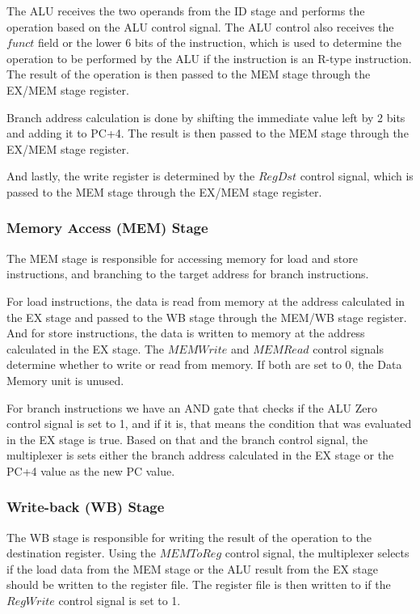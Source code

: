 The ALU receives the two operands from the ID stage and performs the operation based on the ALU control signal. The ALU control also receives the $funct$ field or the lower 6 bits of the instruction, which is used to determine the operation to be performed by the ALU if the instruction is an R-type instruction. The result of the operation is then passed to the MEM stage through the EX/MEM stage register.

Branch address calculation is done by shifting the immediate value left by 2 bits and adding it to PC+4. The result is then passed to the MEM stage through the EX/MEM stage register.

And lastly, the write register is determined by the $RegDst$ control signal, which is passed to the MEM stage through the EX/MEM stage register.


\subsubsection{Memory Access (MEM) Stage}
The MEM stage is responsible for accessing memory for load and store instructions, and branching to the target address for branch instructions.

For load instructions, the data is read from memory at the address calculated in the EX stage and passed to the WB stage through the MEM/WB stage register. And for store instructions, the data is written to memory at the address calculated in the EX stage. The $MEMWrite$ and $MEMRead$ control signals determine whether to write or read from memory. If both are set to 0, the Data Memory unit is unused.

For branch instructions we have an AND gate that checks if the ALU Zero control signal is set to 1, and if it is, that means the condition that was evaluated in the EX stage is true. Based on that and the branch control signal, the multiplexer is sets either the branch address calculated in the EX stage or the PC+4 value as the new PC value.

\subsubsection{Write-back (WB) Stage}
The WB stage is responsible for writing the result of the operation to the destination register. Using the $MEMToReg$ control signal, the multiplexer selects if the load data from the MEM stage or the ALU result from the EX stage should be written to the register file. The register file is then written to if the $RegWrite$ control signal is set to 1.

